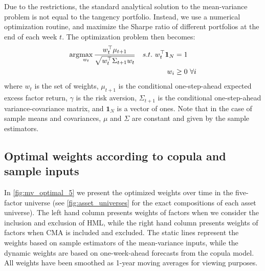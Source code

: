 Due to the restrictions, the standard analytical solution to the mean-variance problem is not equal to the tangency portfolio. Instead, we use a numerical optimization routine, and maximize the Sharpe ratio of different portfolios at the end of each week $t$. The optimization problem then becomes:
\begin{align}
	\arg\!\max_{w_t} \frac{w_t^\top \mu_{t+1}}{\sqrt{w_t^\top \Sigma_{t+1} w_t}} && s.t.\,\,w_t^\top \mathbf{1}_N &= 1 \\
	&& w_i &\geq 0 \,\, \forall i \notag
\end{align}
where $w_t$ is the set of weights, $\mu_{t+1}$ is the conditional one-step-ahead expected excess factor return, $\gamma$ is the risk aversion, $\Sigma_{t+1}$ is the conditional one-step-ahead variance-covariance matrix, and $\mathbf{1}_N$ is a vector of ones. Note that in the case of sample means and covariances, $\mu$ and $\Sigma$ are constant and given by the sample estimators. 

\subsection{Optimal weights according to copula and sample inputs}
In \autoref{fig:mv_optimal_5} we present the optimized weights over time in the five-factor universe (see \autoref{fig:asset_universes} for the exact compositions of each asset universe). The left hand column presents weights of factors when we consider the inclusion and exclusion of HML, while the right hand column presents weights of factors when CMA is included and excluded. The static lines represent the weights based on sample estimators of the mean-variance inputs, while the dynamic weights are based on one-week-ahead forecasts from the copula model. All weights have been smoothed as 1-year moving averages for viewing purposes. 

